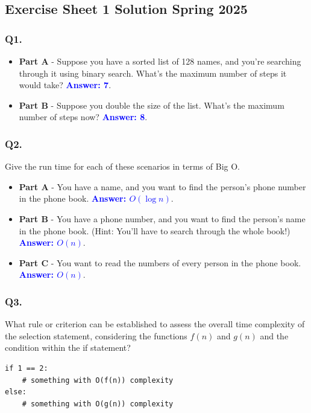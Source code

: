 \subsection{\textbf{Exercise Sheet 1 Solution Spring 2025}}

\subsubsection{Q1.}
\begin{itemize}
  \item \textbf{Part A} - Suppose you have a sorted list of 128 names, and you’re searching through it using binary search. What’s the maximum number of steps it would take? 
  \textcolor{blue}{\textbf{Answer: 7}}.
  \item \textbf{Part B} - Suppose you double the size of the list. What’s the maximum number of steps now? 
  \textcolor{blue}{\textbf{Answer: 8}}.
\end{itemize}

\subsubsection{Q2.}
Give the run time for each of these scenarios in terms of Big O.
\begin{itemize}
  \item \textbf{Part A} - You have a name, and you want to find the person’s phone number in the phone book. 
  \textcolor{blue}{\textbf{Answer: $O(\log n)$}}.
  \item \textbf{Part B} - You have a phone number, and you want to find the person’s name in the phone book. (Hint: You’ll have to search through the whole book!) 
  \textcolor{blue}{\textbf{Answer: $O(n)$}}.
  \item \textbf{Part C} - You want to read the numbers of every person in the phone book. 
  \textcolor{blue}{\textbf{Answer: $O(n)$}}.
\end{itemize}

\subsubsection{Q3.}
What rule or criterion can be established to assess the overall time complexity of the selection statement, considering the functions $f(n)$ and $g(n)$ and the condition within the if statement?
\begin{lstlisting}[frame=single]
if 1 == 2:
    # something with O(f(n)) complexity
else:
    # something with O(g(n)) complexity
\end{lstlisting}

